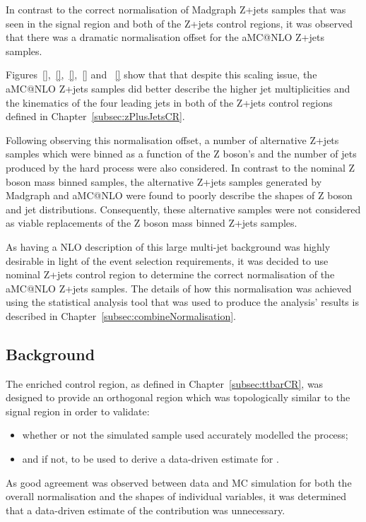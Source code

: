 In contrast to the correct normalisation of Madgraph Z+jets samples that was seen in the signal region and both of the Z+jets control regions, it was observed that there was a dramatic normalisation offset for the aMC@NLO Z+jets samples.

Figures~\ref{},~\ref{},~\ref{},~\ref{} and ~\ref{} show that that despite this scaling issue, the aMC@NLO Z+jets samples did better describe the higher jet multiplicities and the kinematics of the four leading jets in both of the Z+jets control regions defined in Chapter~\ref{subsec:zPlusJetsCR}.

Following observing this normalisation offset, a number of alternative Z+jets samples which were binned as a function of the Z boson's \pT and the number of jets produced by the hard process were also considered.
In contrast to the nominal Z boson mass binned samples, the alternative Z+jets samples generated by Madgraph and aMC@NLO were found to poorly describe the shapes of Z boson and jet distributions.
Consequently, these alternative samples were not considered as viable replacements of the Z boson mass binned Z+jets samples.

As having a NLO description of this large multi-jet background was highly desirable in light of the event selection requirements, it was decided to use nominal Z+jets control region to determine the correct normalisation of the aMC@NLO Z+jets samples.
The details of how this normalisation was achieved using the statistical analysis tool that was used to produce the analysis' results is described in Chapter~\ref{subsec:combineNormalisation}.

\subsection{\ttbar Background}\label{subsec:ttbarEstimation}
The \ttbar enriched control region, as defined in Chapter~\ref{subsec:ttbarCR}, was designed to provide an orthogonal region which was topologically similar to the signal region in order to validate:
\begin{itemize}
\item whether or not the simulated \ttbar sample used accurately modelled the \ttbar process;
\item and if not, to be used to derive a data-driven estimate for \ttbar.
\end{itemize}

As good agreement was observed between data and MC simulation for both the overall normalisation and the shapes of individual variables, it was determined that a data-driven estimate of the \ttbar contribution was unnecessary.

